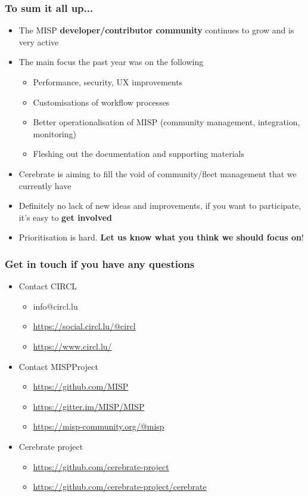 \begin{frame}
  \frametitle{To sum it all up...}
  \begin{itemize}
     \item The MISP {\bf developer/contributor community} continues to grow and is very active
     \item The main focus the past year was on the following
     \begin{itemize}
          \item Performance, security, UX improvements
          \item Customisations of workflow processes
          \item Better operationalisation of MISP (community management, integration, monitoring)
          \item Fleshing out the documentation and supporting materials
     \end{itemize}
     \item Cerebrate is aiming to fill the void of community/fleet management that we currently have
     \item Definitely no lack of new ideas and improvements, if you want to participate, it's easy to {\bf get involved}
     \item Prioritisation is hard. {\bf Let us know what you think we should focus on}!
  \end{itemize}
\end{frame}

\begin{frame}
  \frametitle{Get in touch if you have any questions}
  \begin{itemize}
    \item Contact CIRCL
    \begin{itemize}
      \item info@circl.lu
      \item \url{https://social.circl.lu/@circl}
      \item \url{https://www.circl.lu/}
    \end{itemize}
    \item Contact MISPProject 
    \begin{itemize}
      \item \url{https://github.com/MISP}
      \item \url{https://gitter.im/MISP/MISP}
      \item \url{https://misp-community.org/@misp}
    \end{itemize}
    \item Cerebrate project
    \begin{itemize}
      \item \url{https://github.com/cerebrate-project}
      \item \url{https://github.com/cerebrate-project/cerebrate}
    \end{itemize}
  \end{itemize}
\end{frame}
